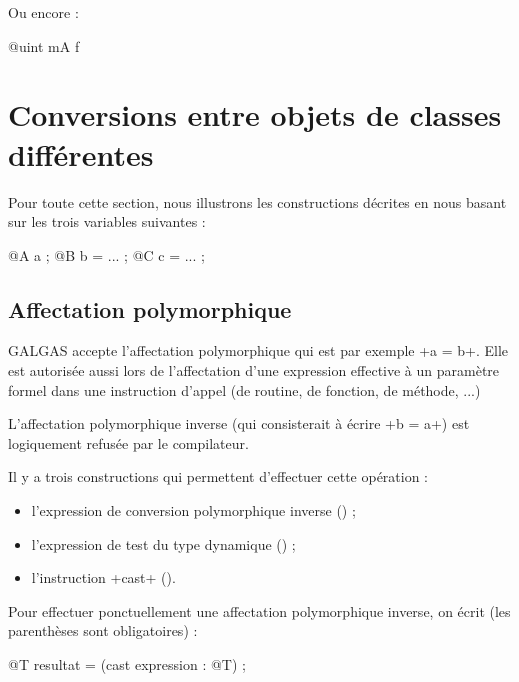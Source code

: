 Ou encore :

\begin{galgas}
  @uint mA f%
\end{galgas}












\section{Conversions entre objets de classes différentes}

Pour toute cette section, nous illustrons les constructions décrites en nous basant sur les trois variables suivantes :

\begin{galgas}
@A a ;
@B b = ... ;
@C c = ... ;
\end{galgas}

\subsection{Affectation polymorphique}

GALGAS accepte l'affectation polymorphique qui est par exemple \ggs+a = b+. Elle est autorisée aussi lors de l'affectation d'une expression effective à un paramètre formel dans une instruction d'appel (de routine, de fonction, de méthode, ...)

L'affectation polymorphique inverse (qui consisterait à écrire \ggs+b = a+) est logiquement refusée par le compilateur.

Il y a trois constructions qui permettent d'effectuer cette opération :
\begin{itemize}
  \item l'expression de conversion polymorphique inverse () ;
  \item l'expression de test du type dynamique () ;
  \item l'instruction \ggs+cast+ ().
\end{itemize}

Pour effectuer ponctuellement une affectation polymorphique inverse, on écrit (les parenthèses sont obligatoires) :

\begin{galgas}
@T resultat = (cast expression : @T) ;
\end{galgas}

